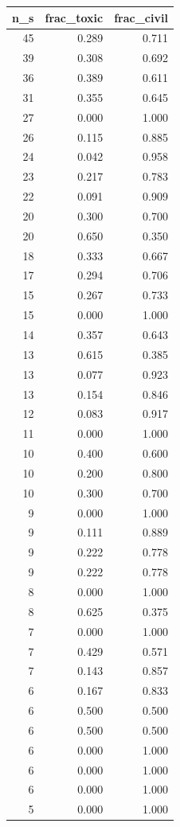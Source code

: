 \begin{tabular}{rrr}
\toprule
n_s & frac_toxic & frac_civil \\
\midrule
45 & 0.289 & 0.711 \\
39 & 0.308 & 0.692 \\
36 & 0.389 & 0.611 \\
31 & 0.355 & 0.645 \\
27 & 0.000 & 1.000 \\
26 & 0.115 & 0.885 \\
24 & 0.042 & 0.958 \\
23 & 0.217 & 0.783 \\
22 & 0.091 & 0.909 \\
20 & 0.300 & 0.700 \\
20 & 0.650 & 0.350 \\
18 & 0.333 & 0.667 \\
17 & 0.294 & 0.706 \\
15 & 0.267 & 0.733 \\
15 & 0.000 & 1.000 \\
14 & 0.357 & 0.643 \\
13 & 0.615 & 0.385 \\
13 & 0.077 & 0.923 \\
13 & 0.154 & 0.846 \\
12 & 0.083 & 0.917 \\
11 & 0.000 & 1.000 \\
10 & 0.400 & 0.600 \\
10 & 0.200 & 0.800 \\
10 & 0.300 & 0.700 \\
9 & 0.000 & 1.000 \\
9 & 0.111 & 0.889 \\
9 & 0.222 & 0.778 \\
9 & 0.222 & 0.778 \\
8 & 0.000 & 1.000 \\
8 & 0.625 & 0.375 \\
7 & 0.000 & 1.000 \\
7 & 0.429 & 0.571 \\
7 & 0.143 & 0.857 \\
6 & 0.167 & 0.833 \\
6 & 0.500 & 0.500 \\
6 & 0.500 & 0.500 \\
6 & 0.000 & 1.000 \\
6 & 0.000 & 1.000 \\
6 & 0.000 & 1.000 \\
5 & 0.000 & 1.000 \\

\end{tabular}
